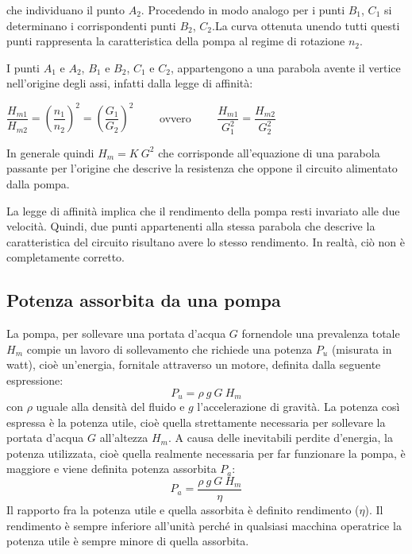 \documentclass[laurea,oneside,11pt]{USiena_tesiLM3}
\begin{document}
che individuano il punto $A_2$. Procedendo in modo analogo per i punti $B_1$, $C_1$ si determinano i corrispondenti punti $B_2$, $C_2$.La curva ottenuta unendo tutti questi punti rappresenta la caratteristica della pompa al regime di rotazione $n_2$.

I punti $A_1$ e $A_2$, $B_1$ e $B_2$, $C_1$ e $C_2$, appartengono a una parabola avente il vertice nell'origine degli assi, infatti dalla legge di affinità:
\begin{center}
$\dfrac{H_{m1}}{H_{m2}}=\left(\dfrac{n_1}{n_2} \right)^2 = \left(\dfrac{G_1}{G_2} \right)^2  \qquad$ ovvero   $\qquad \dfrac{H_{m1}}{G_1^2}=\dfrac{H_{m2}}{G_2^2}$ 
\end{center}
In generale quindi $H_m = K \ G^2$ che corrisponde all'equazione di una parabola passante per l'origine che descrive la resistenza che oppone il circuito alimentato dalla pompa.

La legge di affinità implica che il rendimento della pompa resti invariato alle due velocità. Quindi, due punti appartenenti alla stessa parabola che descrive la caratteristica del circuito risultano avere lo stesso rendimento. In realtà, ciò non è completamente corretto.


\subsection{Potenza assorbita da una pompa}
La pompa, per sollevare una portata d'acqua $G$ fornendole una prevalenza totale $H_m$ compie un lavoro di sollevamento che richiede una potenza $P_u$ (misurata in watt), cioè un'energia, fornitale attraverso un motore, definita dalla seguente espressione:
\begin{equation}
P_u = \rho \ g \ G \ H_m
\end{equation}
con $\rho$ uguale alla densità del fluido e $g$ l'accelerazione di gravità.
La potenza così espressa è la potenza utile, cioè quella strettamente necessaria per sollevare la portata d'acqua $G$ all'altezza $H_m$. A causa delle inevitabili perdite d'energia, la potenza utilizzata, cioè quella realmente necessaria per far funzionare la pompa, è maggiore e viene definita potenza assorbita $P_a$:
\begin{equation}
P_a = \dfrac{\rho \ g \ G \ H_m}{\eta}
\label{eq:pot}
\end{equation}
Il rapporto fra la potenza utile e quella assorbita è definito rendimento ($\eta$). Il rendimento è sempre inferiore all'unità perché in qualsiasi macchina operatrice la potenza utile è sempre minore di quella assorbita. 
\end{document}
